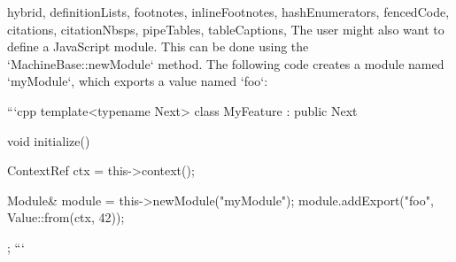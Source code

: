 \begin{markdown*}{%
  hybrid,
  definitionLists,
  footnotes,
  inlineFootnotes,
  hashEnumerators,
  fencedCode,
  citations,
  citationNbsps,
  pipeTables,
  tableCaptions,
}
The user might also want to define a JavaScript module. This can be done using the `MachineBase::newModule` method. The following code creates a module named `myModule`, which exports a value named `foo`:

```cpp
template<typename Next>
class MyFeature : public Next {
    void initialize() {
        ContextRef ctx = this->context();

        Module& module = this->newModule("myModule");
        module.addExport("foo", Value::from(ctx, 42));
    }
};
```


\end{markdown*}

